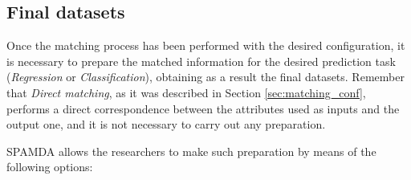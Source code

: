 \documentclass[energies,article,submit,moreauthors,pdftex]{Definitions/mdpi}
\begin{document}
				
			\subsection{Final datasets} \label{sec:FinalDatasets}

				Once the matching process has been performed with the desired configuration, it is necessary to prepare the matched information for the desired prediction task (\textit{Regression} or \textit{Classification}), obtaining as a result the final datasets. Remember that \textit{Direct matching}, as it was described in Section \ref{sec:matching_conf}, performs a direct correspondence between the attributes used as inputs and the output one, and it is not necessary to carry out any preparation.
				
				SPAMDA allows the researchers to make such preparation by means of the following options:
				
\end{document}
